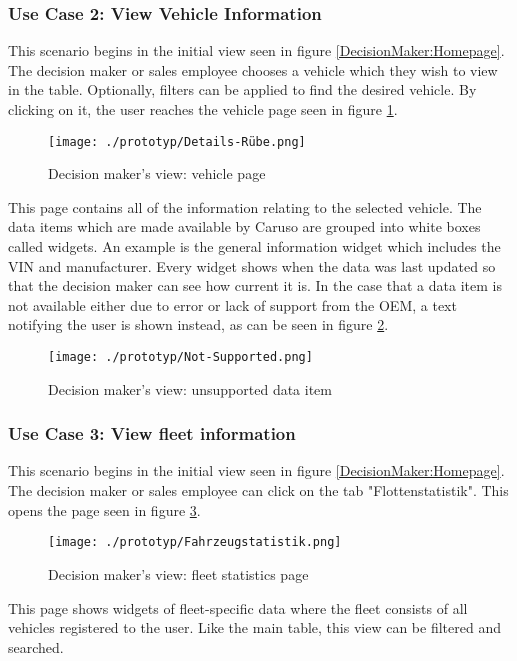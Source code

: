 \subsubsection{Use Case 2: View Vehicle Information}
This scenario begins in the initial view seen in figure \ref{DecisionMaker:Homepage}. The decision maker or sales employee chooses a vehicle which they wish to view in the table. Optionally, filters can be applied to find the desired vehicle. By clicking on it, the user reaches the vehicle page seen in figure \ref{DecisionMaker:DetailsRube}.

\begin{figure}[ht]
  \centering
  \texttt{[image: ./prototyp/Details-Rübe.png]}
  \caption{Decision maker's view: vehicle page}
  \label{DecisionMaker:DetailsRube}
\end{figure}

This page contains all of the information relating to the selected vehicle. The data items which are made available by Caruso are grouped into white boxes called widgets. An example is the general information widget which includes the VIN and manufacturer. Every widget shows when the data was last updated so that the decision maker can see how current it is. In the case that a data item is not available either due to error or lack of support from the OEM, a text notifying the user is shown instead, as can be seen in figure \ref{DecisionMaker:NotSupported}.


\begin{figure}[ht]
  \centering
  \texttt{[image: ./prototyp/Not-Supported.png]}
  \caption{Decision maker's view: unsupported data item}
  \label{DecisionMaker:NotSupported}
\end{figure}

\subsubsection{Use Case 3: View fleet information}
This scenario begins in the initial view seen in figure \ref{DecisionMaker:Homepage}. The decision maker or sales employee can click on the tab "Flottenstatistik". This opens the page seen in figure \ref{DecisionMaker:Fahrzeugstatistik}.
\begin{figure}[H]
  \centering
  \texttt{[image: ./prototyp/Fahrzeugstatistik.png]}
  \caption{Decision maker's view: fleet statistics page}
  \label{DecisionMaker:Fahrzeugstatistik}
\end{figure}
This page shows widgets of fleet-specific data where the fleet consists of all vehicles registered to the user. Like the main table, this view can be filtered and searched.


